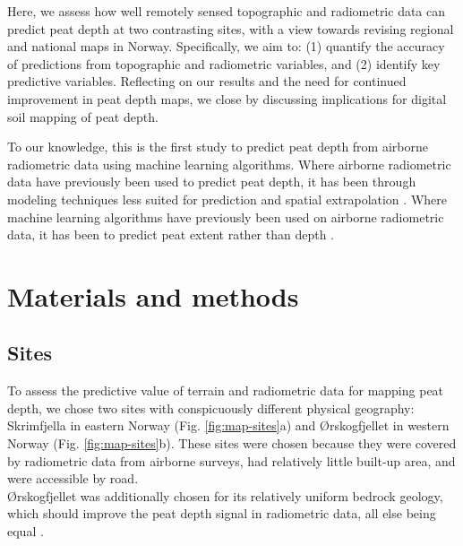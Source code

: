 \documentclass[soil, manuscript]{copernicus}
\begin{document}
Here, we assess how well remotely sensed topographic and radiometric data can predict peat depth at two contrasting sites, with a view towards revising regional and national maps in Norway.
Specifically, we aim to: (1) quantify the accuracy of predictions from topographic and radiometric variables, and (2) identify key predictive variables.
Reflecting on our results and the need for continued improvement in peat depth maps, we close by discussing implications for digital soil mapping of peat depth.

To our knowledge, this is the first study to predict peat depth from airborne radiometric data using machine learning algorithms.
Where airborne radiometric data have previously been used to predict peat depth, it has been through modeling techniques less suited for prediction and spatial extrapolation \citep[e.g.,][]{keaneySpatialStatisticsEstimate2013, gatisMappingUplandPeat2019, siemonAirborneElectromagneticRadiometric2020}.
Where machine learning algorithms have previously been used on airborne radiometric data, it has been to predict peat extent rather than depth \citep[e.g.,][]{olearyDigitalSoilMapping2022}.

\section{Materials and methods}

\subsection{Sites}

To assess the predictive value of terrain and radiometric data for mapping peat depth, we chose two sites with conspicuously different physical geography: Skrimfjella in eastern Norway (Fig. \ref{fig:map-sites}a) and Ørskogfjellet in western Norway (Fig. \ref{fig:map-sites}b).
These sites were chosen because they were covered by radiometric data from airborne surveys, had relatively little built-up area, and were accessible by road.\\
Ørskogfjellet was additionally chosen for its relatively uniform bedrock geology, which should improve the peat depth signal in radiometric data, all else being equal \citep{minasnyDigitalMappingPeatlands2019}.
\end{document}

